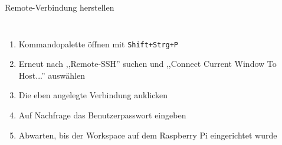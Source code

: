 {\begin{frame}{Remote-Verbindung herstellen}
    \framebreak

    \begin{columns}





        \begin{enumerate}
            \item Kommandopalette öffnen mit \texttt{Shift+Strg+P}
            \item Erneut nach ,,Remote-SSH'' suchen und ,,Connect Current Window To Host...'' auswählen
            \item Die eben angelegte Verbindung anklicken
            \item Auf Nachfrage das Benutzerpasswort eingeben
            \item Abwarten, bis der Workspace auf dem Raspberry Pi eingerichtet wurde
        \end{enumerate}
    \end{columns}
\end{frame}
}

